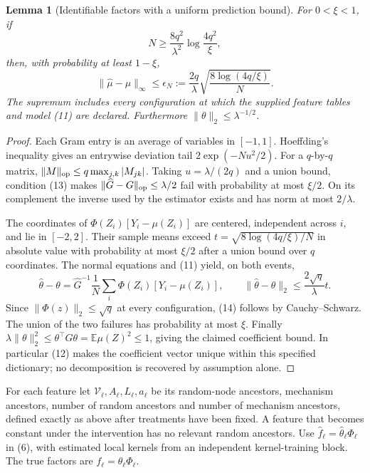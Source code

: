 \documentclass[11pt]{article}
\newtheorem{lemma}[theorem]{Lemma}
\theoremstyle{definition}
\begin{document}
\begin{lemma}[Identifiable factors with a uniform prediction bound]
For $0<\xi<1$, if
\[
 N\ge\frac{8q^2}{\lambda^2}
                         \log\frac{4q^2}{\xi},       \tag{13}
\]
then, with probability at least $1-\xi$,
\[
 \|\widehat\mu-\mu\|_\infty\le
 \epsilon_N:=\frac{2q}{\lambda}
                 \sqrt{\frac{8\log(4q/\xi)}{N}}.       \tag{14}
\]
The supremum includes every configuration at which the supplied feature
tables and model (11) are declared. Furthermore
$\|\theta\|_2\le\lambda^{-1/2}$.
\end{lemma}
\begin{proof}
Each Gram entry is an average of variables in $[-1,1]$.
Hoeffding's inequality gives an entrywise deviation tail
$2\exp(-Nu^2/2)$. For a $q$-by-$q$ matrix,
$\|M\|_{\rm op}\le q\max_{j,k}|M_{jk}|$.
Taking $u=\lambda/(2q)$ and a union bound, condition (13) makes
$\|\widehat G-G\|_{\rm op}\le\lambda/2$ fail with probability
at most $\xi/2$. On its complement the inverse used by the estimator
exists and has norm at most $2/\lambda$.

The coordinates of
$\Phi(Z_i)[Y_i-\mu(Z_i)]$ are centered, independent across $i$,
and lie in $[-2,2]$. Their sample means exceed
$t=\sqrt{8\log(4q/\xi)/N}$ in absolute value with probability
at most $\xi/2$ after a union bound over $q$ coordinates.
The normal equations and (11) yield, on both events,
\[
 \widehat\theta-\theta
 =\widehat G^{-1}\frac1N\sum_i
                \Phi(Z_i)[Y_i-\mu(Z_i)],\qquad
 \|\widehat\theta-\theta\|_2\le\frac{2\sqrt q}{\lambda}t.
\]
Since $\|\Phi(z)\|_2\le\sqrt q$ at every configuration, (14)
follows by Cauchy--Schwarz. The union of the two failures has probability
at most $\xi$. Finally
$\lambda\|\theta\|_2^2\le\theta^\top G\theta
 =\mathbb E\mu(Z)^2\le1$, giving the claimed coefficient bound.
In particular (12) makes the coefficient vector unique within this
specified dictionary; no decomposition is recovered by assumption alone.
\end{proof}

For each feature let $\mathcal V_\ell,A_\ell,L_\ell,a_\ell$
be its random-node ancestors, mechanism ancestors, number of random
ancestors and number of mechanism ancestors, defined exactly as above
after treatments have been fixed. A feature that becomes constant under
the intervention has no relevant random ancestors. Use
$\widehat f_\ell=\widehat\theta_\ell\Phi_\ell$ in (6), with
estimated local kernels from an independent kernel-training block.
The true factors are $f_\ell=\theta_\ell\Phi_\ell$.
\end{document}
